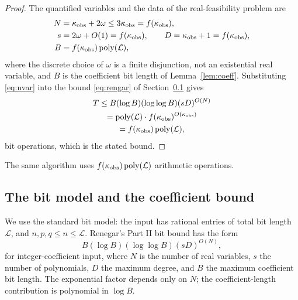 \begin{proof}
The quantified variables and the data of the real-feasibility problem are
\begin{equation}\label{eq:nvar}
\begin{aligned}
N&=\kappa_{\rm obs}+2\omega\le3\kappa_{\rm obs}=f(\kappa_{\rm obs}),\\
s&=2\omega+O(1)=f(\kappa_{\rm obs}),\qquad
D=\kappa_{\rm obs}+1=f(\kappa_{\rm obs}),\\
B&=f(\kappa_{\rm obs})\operatorname{poly}(\mathcal L),
\end{aligned}
\end{equation}
where the discrete choice of $\omega$ is a finite disjunction, not an
existential real variable, and $B$ is the coefficient bit length of
Lemma~\ref{lem:coeff}. Substituting \eqref{eq:nvar} into the bound
\eqref{eq:rengar} of Section~\ref{sec:bitsize} gives
\begin{equation*}
\begin{gathered}
T\le B(\log B)(\log\log B)(sD)^{O(N)}\\
=\operatorname{poly}(\mathcal L)\cdot f(\kappa_{\rm obs})^{O(\kappa_{\rm obs})}\\
=f(\kappa_{\rm obs})\operatorname{poly}(\mathcal L),
\end{gathered}
\end{equation*}
bit operations, which is the stated bound.
\end{proof}

\begin{cor}\label{cor:arith}
The same algorithm uses $f(\kappa_{\rm obs})\operatorname{poly}(\mathcal L)$
arithmetic operations.
\end{cor}

\subsection{The bit model and the coefficient bound}\label{sec:bitsize}

We use the standard bit model: the input has rational entries of total bit
length $\mathcal L$, and $n,p,q\le n\le\mathcal L$. Renegar's Part II bit bound
\cite{ren92} has the form
\begin{equation}\label{eq:rengar}
B(\log B)(\log\log B)(sD)^{O(N)},
\end{equation}
for integer-coefficient input, where $N$ is the number of real variables, $s$
the number of polynomials, $D$ the maximum degree, and $B$ the maximum
coefficient bit length. The exponential factor depends only on $N$; the
coefficient-length contribution is polynomial in $\log B$.

